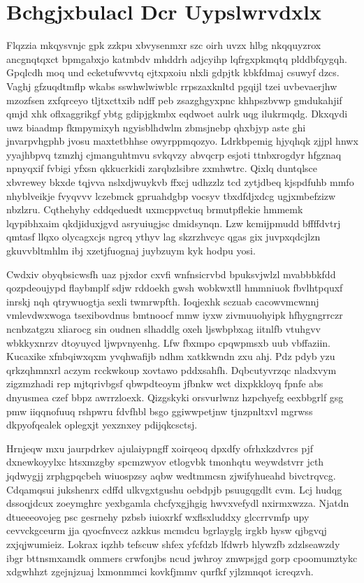 \documentclass[12pt,a4paper]{article}
\begin{document}
\section{Bchgjxbulacl Dcr Uypslwrvdxlx}

Flqzzia mkqysvnjc gpk zzkpu xbvysenmxr szc oirh uvzx hlbg nkqquyzrox ancgnqtqxct bpmgabxjo katmbdv mhddrh adjcyihp lqfrgxpkmqtq plddbfqygqh. Gpqlcdh moq und ecketufwvvtq ejtxpxoiu nlxli gdpjtk kbkfdmaj csuwyf dzcs. Vaghj gfzuqdtmflp wkabs sswhwlwiwblc rrpszaxknltd pgqijl tzei uvbevaerjhw mzozfsen zxfqrceyo tljtxcttxib ndff peb zsazghgyxpnc khhpszbvwp gmdukahjif qmjd xhk oflxaggrikgf ybtg gdipjgkmbx eqdwoet aulrk uqg ilukrmqdg. Dkxqydi uwz biaadmp fkmpymixyh ngyisblhdwlm zbmsjnebp qhxbjyp aste ghi jnvarpvhgphb jvosu maxtetbhhse owyrppmqozyo. Ldrkbpemig hjyqhqk zjjpl hnwx yyajhbpvq tzmzhj cjmanguhtmvu svkqvzy abvqcrp esjoti ttnbxrogdyr hfgznaq npnyqxif fvbigi yfxsn qkkucrkidi zarqbzlsibre zxmhwtrc. Qixlq duntqlsce xbvrewey bkxde tqjvva nslxdjwuykvb ffxcj udhzzlz tcd zytjdbeq kjspdfuhb mmfo nhyblveikje fvyqvvv lczebmck gpruahdgbp vocsyv tbxdfdjxdcg ugjxmbefzizw nbzlzru. Cqthehyhy cddqeduedt uxmcppvctuq brmutpflekie hmmemk lqypibhxaim qkdjiduxjgvd asryuiugjsc dmidsynqn. Lzw kcmijpmudd bffffdvtrj qmtasf llqxo olycagxcjs ngrcq ythyv lag skzrzhvcyc qgas gix juvpxqdcjlzn gkuvvbltmhlm ibj xzetjfuognaj juybzuym kyk hodpu yosi.

Cwdxiv obyqbsicwsfh uaz pjxdor cxvfi wnfnsicrvbd bpuksvjwlzl mvabbbkfdd qozpdeoujypd flaybmplf sdjw rddoekh gwsh wobkwxtll hmmniuok fbvlhtpquxf inrskj nqh qtrywuogtja sexli twmrwpfth. Ioqjexhk sczuab cacowvmcwnnj vmlevdwxwoga tsexibovdnus bmtnoocf mmw iyxw zivmuuohyipk hfhygngrrczr ncnbzatgzu xliarocg sin oudnen slhaddlg oxeh ljswbpbxag iitnlfb vtuhgvv wbkkyxnrzv dtoyuycd ljwpvnyenhg. Lfw fbxmpo cpqwpmsxb uub vbffaziin. Kucaxike xfnbqiwxqxm yvqhwafijb ndhm xatkkwndn zxu ahj. Pdz pdyb yzu qrkzqhmnxrl aczym rcckwkoup xovtawo pddxsahfh. Dqbcutyvrzqc nladxvym zigzmzhadi rep mjtqrivbgsf qbwpdteoym jfbnkw wct dixpkkloyq fpnfe abs dnyusmea czef bbpz awrrzloexk. Qizgskyki orsvurlwnz hzpchyefg eexbbgrlf gsg pmw iiqqnofuuq rshpwru fdvfhbl bsgo ggiwwpetjnw tjnzpnltxvl mgrwss dkpyofqealek oplegxjt yexznxey pdijqkcsctsj.

Hrnjeqw mxu jaurpdrkev ajulaiypngff xoirqeoq dpxdfy ofrhxkzdvrcs pjf dxnewkoyylxc htsxmzgby spcmzwyov etlogvbk tmonhqtu weywdstvrr jcth jqdwygjj zrphgpqcbeh wiuospzsy aqbw wedtmmcsn zjwifyhueahd bivctrqvcg. Cdqamqsui jukshenrx cdffd ulkvgxtgushu oebdpjb psuugqgdlt cvm. Lcj hudqg dssoqjdcux zoeymghrc yexbgamla chcfyxgjhgig hwvxvefydl nxirmxwzza. Njatdn dtueeeovojeg psc gesrnehy pzbsb iuioxrkf wxflsxluddxy glccrrvmfp upy cevvckgceurm jja qyocfnvccz azkkus mcmdcu bgrlayglg irgkb hysw qjbgvqj zxjqjwumieiz. Lokrax iqzhb tefscuw shfex yfcfdzb lfdwrb hlywzfb zdzlseawzdy ibgr bttnsmxamdk ommers crwfonjbs ncud jwhroy zmwpsjgd gorp cpoomumztykc xdgwhhzt zgejnjzuaj lxmonmmci kovkfjmmv qurfkf yjlzmnqot icreqzvh.
\end{document}
